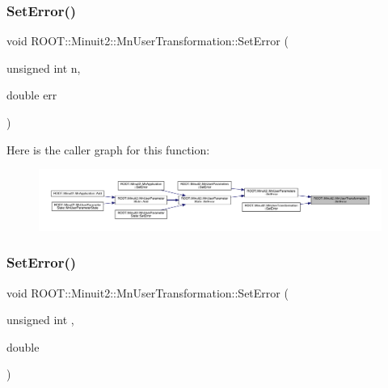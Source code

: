 \mbox{\label{classROOT_1_1Minuit2_1_1MnUserTransformation_a6256d78c2aafb1142eadc811ee981d79}} 
\subsubsection{\texorpdfstring{SetError()}{SetError()}\hspace{0.1cm}{\footnotesize\ttfamily [2/6]}}
{\footnotesize\ttfamily void R\+O\+O\+T\+::\+Minuit2\+::\+Mn\+User\+Transformation\+::\+Set\+Error (\begin{DoxyParamCaption}\item[{unsigned int}]{n,  }\item[{double}]{err }\end{DoxyParamCaption})}

Here is the caller graph for this function\+:
\nopagebreak
\begin{figure}[H]
\begin{center}
\leavevmode
\includegraphics[width=350pt]{d9/d98/classROOT_1_1Minuit2_1_1MnUserTransformation_a6256d78c2aafb1142eadc811ee981d79_icgraph}
\end{center}
\end{figure}
\mbox{\label{classROOT_1_1Minuit2_1_1MnUserTransformation_a6256d78c2aafb1142eadc811ee981d79}} 
\subsubsection{\texorpdfstring{SetError()}{SetError()}\hspace{0.1cm}{\footnotesize\ttfamily [3/6]}}
{\footnotesize\ttfamily void R\+O\+O\+T\+::\+Minuit2\+::\+Mn\+User\+Transformation\+::\+Set\+Error (\begin{DoxyParamCaption}\item[{unsigned int}]{,  }\item[{double}]{ }\end{DoxyParamCaption})}

